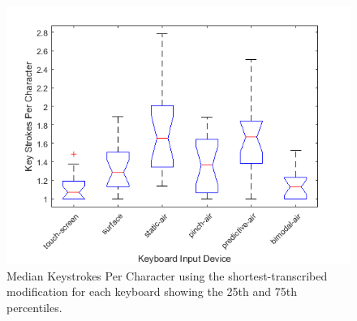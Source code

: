 \begin{figure}[t]
	\centering
	\includegraphics{Figures/fig_KSPC_short_boxplot}
	\caption[Keystrokes Per Character Boxplot for Modified-shortest]{Median Keystrokes Per Character using the shortest-transcribed modification for each keyboard showing the 25th and 75th percentiles.}
	\label{fig_KSPC_short_boxplot}
\end{figure}

